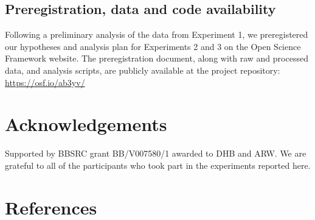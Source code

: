 \documentclass[
]{article}
\begin{document}
\hypertarget{preregistration-data-and-code-availability}{%
\subsection{Preregistration, data and code availability}\label{preregistration-data-and-code-availability}}

Following a preliminary analysis of the data from Experiment 1, we preregistered our hypotheses and analysis plan for Experiments 2 and 3 on the Open Science Framework website. The preregistration document, along with raw and processed data, and analysis scripts, are publicly available at the project repository: \url{https://osf.io/ab3yv/}

\hypertarget{acknowledgements}{%
\section{Acknowledgements}\label{acknowledgements}}

Supported by BBSRC grant BB/V007580/1 awarded to DHB and ARW. We are grateful to all of the participants who took part in the experiments reported here.

\hypertarget{references}{%
\section*{References}\label{references}}
\end{document}
